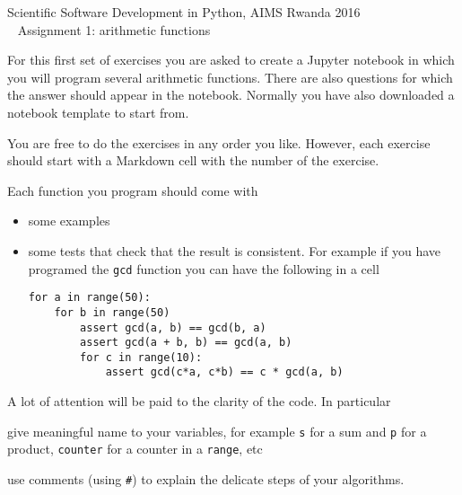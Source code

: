 \documentclass[a4paper]{article}
\begin{document}
\begin{center}
\Large Scientific Software Development in Python, AIMS Rwanda 2016 \\ \smallskip
Assignment 1: arithmetic functions
\end{center}

\bigskip

For this first set of exercises you are asked to create a Jupyter notebook in
which you will program several arithmetic functions. There are also questions
for which the answer should appear in the notebook. Normally you have also
downloaded a notebook template to start from.

You are free to do the exercises in any order you like. However, each exercise
should start with a Markdown cell with the number of the exercise.

Each function you program should come with
\begin{itemize}
\item some examples
\item some tests that check that the result is consistent. For example if you have
programed the \texttt{gcd} function you can have the following in a cell
\begin{verbatim}
for a in range(50):
    for b in range(50)
        assert gcd(a, b) == gcd(b, a)
        assert gcd(a + b, b) == gcd(a, b)
        for c in range(10):
            assert gcd(c*a, c*b) == c * gcd(a, b)
\end{verbatim}
\end{itemize}

A lot of attention will be paid to the clarity of the code. In particular
\begin{compactitem}
\item give meaningful name to your variables, for example \texttt{s} for a
sum and \texttt{p} for a product, \texttt{counter} for a counter in
a \texttt{range}, etc
\item use comments (using \texttt{\#}) to explain the delicate steps
of your algorithms.
\end{compactitem}

\smallskip
\end{document}

